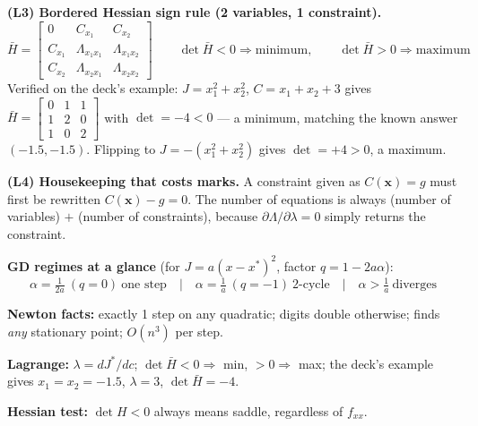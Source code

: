 \begin{derivedbox}
\smallskip
\textbf{(L3) Bordered Hessian sign rule (2 variables, 1 constraint).}
\[
\bar H = \begin{bmatrix}
0 & C_{x_1} & C_{x_2}\\
C_{x_1} & \Lambda_{x_1x_1} & \Lambda_{x_1x_2}\\
C_{x_2} & \Lambda_{x_2x_1} & \Lambda_{x_2x_2}
\end{bmatrix}
\qquad
\boxed{\det\bar H < 0 \Rightarrow \text{minimum},\qquad \det\bar H > 0 \Rightarrow \text{maximum}}
\]
Verified on the deck's example: $J = x_1^2+x_2^2$, $C = x_1+x_2+3$ gives $\bar H = \begin{bmatrix}0&1&1\\1&2&0\\1&0&2\end{bmatrix}$ with $\det = -4 < 0$ --- a minimum, matching the known answer $(-1.5,-1.5)$. Flipping to $J = -(x_1^2+x_2^2)$ gives $\det = +4 > 0$, a maximum.

\smallskip
\textbf{(L4) Housekeeping that costs marks.} A constraint given as $C(\mathbf x) = g$ must first be rewritten $C(\mathbf x) - g = 0$. The number of equations is always (number of variables) $+$ (number of constraints), because $\partial\Lambda/\partial\lambda = 0$ simply returns the constraint.
\end{derivedbox}

\begin{numbox}
\textbf{GD regimes at a glance} (for $J = a(x-x^\ast)^2$, factor $q = 1-2a\alpha$):
\[
\alpha = \tfrac{1}{2a}\ (q=0)\ \text{one step} \quad\big|\quad
\alpha = \tfrac1a\ (q=-1)\ \text{2-cycle} \quad\big|\quad
\alpha > \tfrac1a\ \text{diverges}
\]

\textbf{Newton facts:} exactly 1 step on any quadratic; digits double otherwise; finds \emph{any} stationary point; $O(n^3)$ per step.

\textbf{Lagrange:} $\lambda = dJ^\ast/dc$; $\det\bar H<0 \Rightarrow$ min, $>0 \Rightarrow$ max; the deck's example gives $x_1=x_2=-1.5$, $\lambda = 3$, $\det\bar H = -4$.

\textbf{Hessian test:} $\det H<0$ always means saddle, regardless of $f_{xx}$.
\end{numbox}


